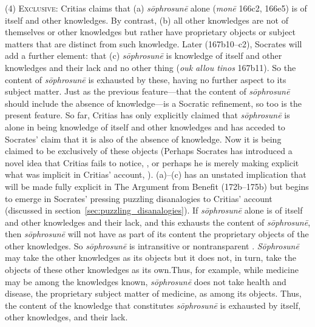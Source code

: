 (4) \textsc{Exclusive}: Critias claims that (a) \emph{sōphrosunē} alone (\emph{monē} 166c2, 166e5) is of itself and other knowledges. By contrast, (b) all other knowledges are not of themselves or other knowledges but rather have proprietary objects or subject matters that are distinct from such knowledge. Later (167b10–c2), Socrates will add a further element: that (c) \emph{sōphrosunē} is knowledge of itself and other knowledges and their lack and no other thing (\emph{ouk allou tinos} 167b11). So the content of \emph{sōphrosunē} is exhausted by these, having no further aspect to its subject matter. Just as the previous feature—that the content of \emph{sōphrosunē} should include the absence of knowledge—is a Socratic refinement, so too is the present feature. So far, Critias has only explicitly claimed that \emph{sōphrosunē} is alone in being knowledge of itself and other knowledges and has acceded to Socrates' claim that it is also of the absence of knowledge. Now it is being claimed to be exclusively of these objects (Perhaps Socrates has introduced a novel idea that Critias fails to notice, \citealt[37–8]{Duncombe:2020gi}, or perhaps he is merely making explicit what was implicit in Critias' account, \citealt[]{Tsouna:2022aa}). (a)–(c) has an unstated implication that will be made fully explicit in The Argument from Benefit (172b–175b) but begins to emerge in Socrates' pressing puzzling disanalogies to Critias' account (discussed in section~\ref{sec:puzzling_disanalogies}). If \emph{sōphrosunē} alone is of itself and other knowledges and their lack, and this exhausts the content of \emph{sōphrosunē}, then \emph{sōphrosunē} will not have as part of its content the proprietary objects of the other knowledges. So \emph{sōphrosunē} is intransitive \citep{McCabe:2007ss} or nontransparent \citep[190]{Tsouna:2022aa}. \emph{Sōphrosunē} may take the other knowledges as its objects but it does not, in turn, take the objects of these other knowledges as its own.Thus, for example, while medicine may be among the knowledges known, \emph{sōphrosunē} does not take health and disease, the proprietary subject matter of medicine, as among its objects. Thus, the content of the knowledge that constitutes \emph{sōphrosunē} is exhausted by itself, other knowledges, and their lack.


